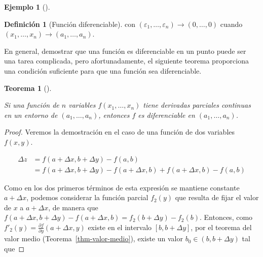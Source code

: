 \documentclass[
  a4paper,
]{scrreport}
\theoremstyle{definition}
\newtheorem{example}{Ejemplo}[chapter]
\theoremstyle{plain}
\theoremstyle{definition}
\newtheorem{definition}{Definición}[chapter]
\theoremstyle{definition}
\theoremstyle{plain}
\newtheorem{theorem}{Teorema}[chapter]
\theoremstyle{plain}
\theoremstyle{remark}
\begin{document}
\begin{example}[]
\begin{definition}[Función
diferenciable]
con \((\varepsilon_1,\ldots, \varepsilon_n) \to (0,\ldots,0)\) cuando
\((x_1,\ldots,x_n)\to (a_1,\ldots,a_n)\).

\end{definition}

En general, demostrar que una función es diferenciable en un punto puede
ser una tarea complicada, pero afortunadamente, el siguiente teorema
proporciona una condición suficiente para que una función sea
diferenciable.

\begin{theorem}[]\protect\hypertarget{thm-diferenciabilidad-funciones-varias-variables}{}\label{thm-diferenciabilidad-funciones-varias-variables}

Si una función de \(n\) variables \(f(x_1,\ldots,x_n)\) tiene derivadas
parciales continuas en un entorno de \((a_1,\ldots,a_n)\), entonces
\(f\) es diferenciable en \((a_1,\ldots,a_n)\).

\end{theorem}

\begin{tcolorbox}[enhanced jigsaw, leftrule=.75mm, colbacktitle=quarto-callout-note-color!10!white, toprule=.15mm, opacityback=0, opacitybacktitle=0.6, toptitle=1mm, breakable, bottomtitle=1mm, colframe=quarto-callout-note-color-frame, rightrule=.15mm, titlerule=0mm, title=\textcolor{quarto-callout-note-color}{\faInfo}\hspace{0.5em}{Demostración}, arc=.35mm, left=2mm, bottomrule=.15mm, colback=white, coltitle=black]

\begin{proof}
Veremos la demostración en el caso de una función de dos variables
\(f(x,y)\).

\begin{align*}
\Delta z 
&= f(a+\Delta x, b+\Delta y) - f(a,b) \\
&= f(a+\Delta x, b+\Delta y) - f(a+\Delta x, b) + f(a+\Delta x, b) - f(a,b) 
\end{align*}

Como en los dos primeros términos de esta expresión se mantiene
constante \(a+\Delta x\), podemos considerar la función parcial
\(f_2(y)\) que resulta de fijar el valor de \(x\) a \(a+\Delta x\), de
manera que
\(f(a+\Delta x, b+\Delta y) - f(a+\Delta x, b) = f_2(b+\Delta y)-f_2(b)\).
Entonces, como \(f'_2(y)=\frac{\partial f}{\partial y}(a+\Delta x, y)\)
existe en el intervalo \([b, b+\Delta y]\), por el teorema del valor
medio (Teorema~\ref{thm-valor-medio}), existe un valor
\(b_0\in(b, b+\Delta y)\) tal que


\end{proof}
\end{tcolorbox}
\end{example}
\end{document}
